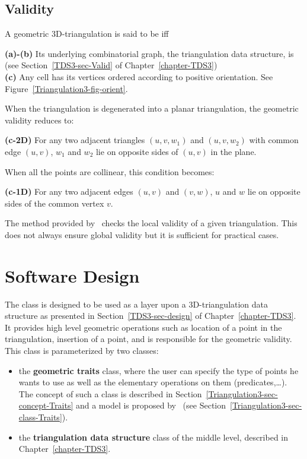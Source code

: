 \subsection{Validity}
\label{Triangulation3-sec-Valid}

A geometric 3D-triangulation is said to be  iff

{\bf (a)-(b)} Its underlying combinatorial graph, the triangulation
data structure, is  
(see Section~\ref{TDS3-sec-Valid} of Chapter~\ref{chapter-TDS3})\\
{\bf (c)} Any cell has its vertices ordered according to positive
orientation. See Figure~\ref{Triangulation3-fig-orient}.

When the triangulation is degenerated into a planar triangulation, the 
geometric validity reduces to:

{\bf (c-2D)} For any two adjacent triangles $(u,v,w_1)$ and $(u,v,w_2)$ with
common edge $(u,v)$, $w_1$ and $w_2$ lie on opposite sides of $(u,v)$
in the plane.

When all the points are collinear, this condition becomes:

{\bf (c-1D)} For any two adjacent edges $(u,v)$ and $(v,w)$, $u$ and
$w$ lie on opposite sides of the common vertex $v$.

The  method provided by \cgal\ checks the local
validity of a given triangulation. This does not always
ensure global validity \cite{mnssssu-cgpvg-96,dlpt-ccpps-98} but it is 
sufficient for practical cases.

\section{Software Design}
\label{Triangulation3-sec-design}

The class  is designed to be used as 
a layer upon a 3D-triangulation data structure as presented in 
Section~\ref{TDS3-sec-design} of Chapter~\ref{chapter-TDS3}.
It provides high level geometric operations such as location of a point
in the  triangulation, insertion of a point, and is responsible for
the geometric validity. This class is parameterized by two classes:
\begin{itemize}
\item {} the \textbf{geometric traits} class, where the user can
specify the type of points he wants to use as well as the elementary
operations on them (predicates,\ldots). The concept of such a class is
described in Section~\ref{Triangulation3-sec-concept-Traits} and a
model is proposed by \cgal\ (see
Section~\ref{Triangulation3-sec-class-Traits}).
\item {} the \textbf{triangulation data structure} class of the middle level, 
described in Chapter~\ref{chapter-TDS3}.
\end{itemize}	

